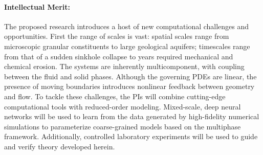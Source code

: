 \documentclass[11pt]{article}
\begin{document}
\paragraph{Intellectual Merit:} The proposed research introduces a host of new computational challenges and opportunities. First the range of scales is vast: spatial scales range from microscopic granular constituents to large geological aquifers; timescales range from that of a sudden sinkhole collapse to years required mechanical and chemical erosion. The systems are inherently multicomponent, with coupling between the fluid and solid phases. Although the governing PDEs are linear, the presence of moving boundaries introduces nonlinear feedback between geometry and flow. To tackle these challenges, the PIs will combine cutting-edge computational tools with reduced-order modeling. Mixed-scale, deep neural networks will be used to learn from the data generated by high-fidelity numerical simulations to parameterize coarse-grained models based on the multiphase framework. Additionally, controlled laboratory experiments will be used to guide and verify theory developed herein.  
\end{document}
